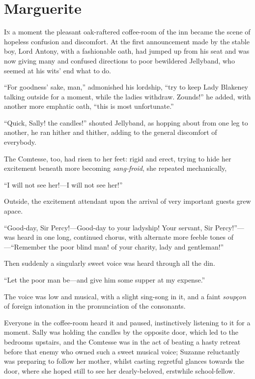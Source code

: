 
\chapter{Marguerite}
\lettrine[lines=4]{I}{n} a moment the pleasant oak-raftered coffee-room of the inn became the scene of hopeless confusion and discomfort. At the first announcement made by the stable boy, Lord Antony, with a fashionable oath, had jumped up from his seat and was now giving many and confused directions to poor bewildered Jellyband, who seemed at his wits’ end what to do.

\enquote{For goodness’ sake, man,} admonished his lordship, \enquote{try to keep Lady Blakeney talking outside for a moment, while the ladies withdraw. Zounds!} he added, with another more emphatic oath, \enquote{this is most unfortunate.}

\enquote{Quick, Sally! the candles!} shouted Jellyband, as hopping about from one leg to another, he ran hither and thither, adding to the general discomfort of everybody.

The Comtesse, too, had risen to her feet: rigid and erect, trying to hide her excitement beneath more becoming \textit{sang-froid}, she repeated mechanically,\longdash


\enquote{I will not see her!---I will not see her!}

Outside, the excitement attendant upon the arrival of very important guests grew apace.

\enquote{Good-day, Sir Percy!---Good-day to your ladyship! Your servant, Sir Percy!}---was heard in one long, continued chorus, with alternate more feeble tones of---\enquote{Remember the poor blind man! of your charity, lady and gentleman!}

Then suddenly a singularly sweet voice was heard through all the din.

\enquote{Let the poor man be---and give him some supper at my expense.}

The voice was low and musical, with a slight sing-song in it, and a faint \textit{soupçon} of foreign intonation in the pronunciation of the consonants.

Everyone in the coffee-room heard it and paused, instinctively listening to it for a moment. Sally was holding the candles by the opposite door, which led to the bedrooms upstairs, and the Comtesse was in the act of beating a hasty retreat before that enemy who owned such a sweet musical voice; Suzanne reluctantly was preparing to follow her mother, whilst casting regretful glances towards the door, where she hoped still to see her dearly-beloved, erstwhile school-fellow.

